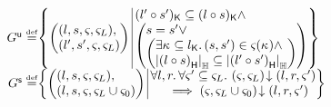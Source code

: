 \begin{definition}[Guarantee]
\[\begin{array}{@{} r @{} l @{}}
	\updateG \eqdef &
 	\left\{
	\begin{array}{@{} l @{\hspace*{2pt}} | @{\hspace*{2pt}} r @{}}
	   	\left(
	   	\begin{array}{@{} l @{}}
	     	(l, s, \amod{}, \amod{L}),\\
	     	(l', s', \amod{}, \amod{L})
	   	\end{array}
		\right)
	  	&
	  	\begin{array}{@{} l @{} }
	  		\capPart{(l' \composeL s')}  \subseteq \capPart{(l \composeL s)} \land\\
		  	\left(
		  	\begin{array}{@{} l @{} }
		 		s = s' \lor\\
		 	  	\left(
		 	  	\begin{array}{@{} l @{}}
		 	  		\exsts{\ca{} \subseteq \capPart{l}}
		 	  		(s, s') \in \amod{}(\ca{}) \land\\
		 	  	
		 	  	\heapSize{\heapPart{\left(l \composeL s\right)}} \subseteq 
		 	  	\heapSize{\heapPart{\left(l' \composeL s'\right)}}
		 	  	\end{array}	
		 	  	\right)
		 	\end{array}
	   		\right)
   		\end{array}
 	\end{array}
	\right\}\\
	
	
	
	\shiftG \eqdef & 
	\left\{
	\begin{array}{@{} l @{\hspace*{2pt}} | @{\hspace*{2pt}} r @{}}
	   \left(
	   \begin{array}{@{} l @{}}
	     (l, s, \amod{}, \amod{L}),\\
 	     \left( l, s, \amod{}, \amod{L} \cup \amod{0}  \right)
	   \end{array}
 	  \right)
	   &
 	  	\begin{array}{@{} l @{}}
	 	  	\for{l, r} \for{\amod{}' \subseteq \amod{L}} \extendsAM{\amod{}, \amod{L}}{l}{r}{\amod{}'} \\
	 	  	\hspace*{0.5cm} \implies \extendsAM{\amod{}, \amod{L} \cup \amod{0}}{l}{r}{\amod{}'}
   		\end{array}
 	\end{array}
	\right\}

\end{array}
\]
%
\end{definition}
